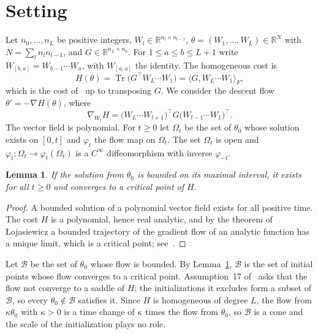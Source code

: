 \documentclass[11pt]{amsart}
\newtheorem{lemma}[theorem]{Lemma}
\theoremstyle{definition}
\theoremstyle{remark}
\numberwithin{equation}{section}
\newcommand{\RR}{\mathbb{R}}
\DeclareMathOperator{\Tr}{Tr}
\begin{document}
\section{Setting}\label{sec:setting}
Let $n_0,\dots,n_L$ be positive integers, $W_l\in\RR^{n_l\times n_{l-1}}$, $\theta=(W_1,\dots,W_L)\in\RR^N$ with $N=\sum_ln_ln_{l-1}$, and $G\in\RR^{n_L\times n_0}$. For $1\le a\le b\le L+1$ write $W_{[b,a]}=W_{b-1}\cdots W_a$, with $W_{[a,a]}$ the identity. The homogeneous cost is
\[
H(\theta)=\Tr\bigl(G^\top W_L\cdots W_1\bigr)=\langle G,W_L\cdots W_1\rangle_F,
\]
which is the cost of~\cite{JGSHG} up to transposing $G$. We consider the descent flow $\theta'=-\nabla H(\theta)$, where
\begin{equation}\label{eq:grad}
\nabla_{W_l}H=\bigl(W_L\cdots W_{l+1}\bigr)^\top G\bigl(W_{l-1}\cdots W_1\bigr)^\top .
\end{equation}
The vector field is polynomial. For $t\ge0$ let $\Omega_t$ be the set of $\theta_0$ whose solution exists on $[0,t]$ and $\varphi_t$ the flow map on $\Omega_t$. The set $\Omega_t$ is open and $\varphi_t\colon\Omega_t\to\varphi_t(\Omega_t)$ is a $C^\infty$ diffeomorphism with inverse $\varphi_{-t}$.

\begin{lemma}\label{lem:loj}
If the solution from $\theta_0$ is bounded on its maximal interval, it exists for all $t\ge0$ and converges to a critical point of $H$.
\end{lemma}
\begin{proof}
A bounded solution of a polynomial vector field exists for all positive time. The cost $H$ is a polynomial, hence real analytic, and by the theorem of \L{}ojasiewicz a bounded trajectory of the gradient flow of an analytic function has a unique limit, which is a critical point; see~\cite{ColdingMinicozzi}.
\end{proof}

Let $\mathcal{B}$ be the set of $\theta_0$ whose flow is bounded. By Lemma~\ref{lem:loj}, $\mathcal{B}$ is the set of initial points whose flow converges to a critical point. Assumption~17 of~\cite{JGSHG} asks that the flow not converge to a saddle of $H$; the initializations it excludes form a subset of $\mathcal{B}$, so every $\theta_0\notin\mathcal{B}$ satisfies it. Since $H$ is homogeneous of degree $L$, the flow from $\kappa\theta_0$ with $\kappa>0$ is a time change of $\kappa$ times the flow from $\theta_0$, so $\mathcal{B}$ is a cone and the scale of the initialization plays no role.
\end{document}
